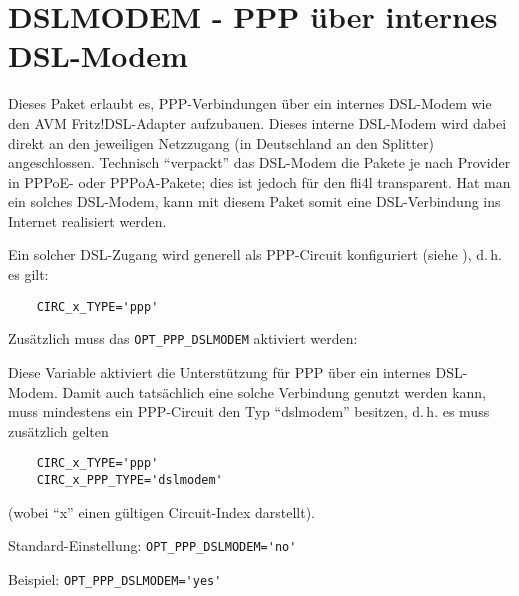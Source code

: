 \section{DSLMODEM - PPP über internes DSL-Modem}

Dieses Paket erlaubt es, PPP-Verbindungen über ein internes DSL-Modem wie den
AVM Fritz!DSL-Adapter aufzubauen. Dieses interne DSL-Modem wird dabei direkt an
den jeweiligen Netzzugang (in Deutschland an den Splitter) angeschlossen.
Technisch ``verpackt'' das DSL-Modem die Pakete je nach Provider in PPPoE- oder
PPPoA-Pakete; dies ist jedoch für den fli4l transparent. Hat man ein solches
DSL-Modem, kann mit diesem Paket somit eine DSL-Verbindung ins Internet
realisiert werden.

Ein solcher DSL-Zugang wird generell als PPP-Circuit konfiguriert (siehe
), d.\,h. es gilt:

\begin{example}
\begin{verbatim}
    CIRC_x_TYPE='ppp'
\end{verbatim}
\end{example}

Zusätzlich muss das \verb+OPT_PPP_DSLMODEM+ aktiviert werden:

\begin{description}

Diese Variable aktiviert die Unterstützung für PPP über ein internes DSL-Modem.
Damit auch tatsächlich eine solche Verbindung genutzt werden kann, muss
mindestens ein PPP-Circuit den Typ ``dslmodem'' besitzen, d.\,h. es muss
zusätzlich gelten

\begin{example}
\begin{verbatim}
    CIRC_x_TYPE='ppp'
    CIRC_x_PPP_TYPE='dslmodem'
\end{verbatim}
\end{example}

(wobei ``x'' einen gültigen Circuit-Index darstellt).

Standard-Einstellung: \verb+OPT_PPP_DSLMODEM='no'+

Beispiel: \verb+OPT_PPP_DSLMODEM='yes'+
\end{description}


